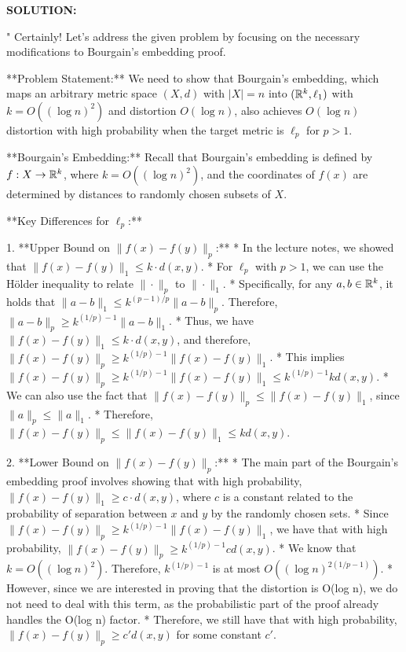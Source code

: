 \begin{enumerate}
\ifdefined\template
\begin{shaded}
\textbf{SOLUTION:}
\ifdefined\sol


"
Certainly! Let's address the given problem by focusing on the necessary modifications to Bourgain's embedding proof.

**Problem Statement:**
We need to show that Bourgain's embedding, which maps an arbitrary metric space $(X, d)$ with $|X| = n$ into $(\mathbb{R}^k, \ell_1)$ with $k = O((\log n)^2)$ and distortion $O(\log n)$, also achieves $O(\log n)$ distortion with high probability when the target metric is $\ell_p$ for $p > 1$.

**Bourgain's Embedding:**
Recall that Bourgain's embedding is defined by $f: X \rightarrow \mathbb{R}^k$, where $k = O((\log n)^2)$, and the coordinates of $f(x)$ are determined by distances to randomly chosen subsets of $X$.

**Key Differences for $\ell_p$:**

1.  **Upper Bound on $\|f(x) - f(y)\|_p$:**
    * In the lecture notes, we showed that $\|f(x) - f(y)\|_1 \leq k \cdot d(x, y)$.
    * For $\ell_p$ with $p > 1$, we can use the Hölder inequality to relate $\|\cdot\|_p$ to $\|\cdot\|_1$.
    * Specifically, for any $a, b \in \mathbb{R}^k$, it holds that $\|a - b\|_1 \leq k^{(p-1)/p} \|a - b\|_p$. Therefore, $\|a - b\|_p \geq k^{(1/p) - 1}\|a - b\|_1$.
    * Thus, we have $\|f(x) - f(y)\|_1 \leq k \cdot d(x,y)$, and therefore, $\|f(x) - f(y)\|_p \geq k^{(1/p) - 1}\|f(x) - f(y)\|_1$.
    * This implies $\|f(x) - f(y)\|_p \geq k^{(1/p)-1} \|f(x) - f(y)\|_1 \leq k^{(1/p)-1}k d(x,y)$.
    * We can also use the fact that $\|f(x) - f(y)\|_p \leq \|f(x) - f(y)\|_1$, since $\|a\|_p \leq \|a\|_1$.
    * Therefore, $\|f(x) - f(y)\|_p \leq \|f(x) - f(y)\|_1 \leq k d(x,y)$.

2.  **Lower Bound on $\|f(x) - f(y)\|_p$:**
    * The main part of the Bourgain's embedding proof involves showing that with high probability, $\|f(x) - f(y)\|_1 \geq c \cdot d(x, y)$, where $c$ is a constant related to the probability of separation between $x$ and $y$ by the randomly chosen sets.
    * Since $\|f(x) - f(y)\|_p \geq k^{(1/p)-1}\|f(x) - f(y)\|_1$, we have that with high probability, $\|f(x) - f(y)\|_p \geq k^{(1/p)-1} c d(x,y)$.
    * We know that $k=O((\log n)^2)$. Therefore, $k^{(1/p)-1}$ is at most $O((\log n)^{2(1/p-1)})$.
    * However, since we are interested in proving that the distortion is O(log n), we do not need to deal with this term, as the probabilistic part of the proof already handles the O(log n) factor.
    * Therefore, we still have that with high probability, $\|f(x) - f(y)\|_p \geq c' d(x,y)$ for some constant $c'$.


\end{shaded}
\end{enumerate}
